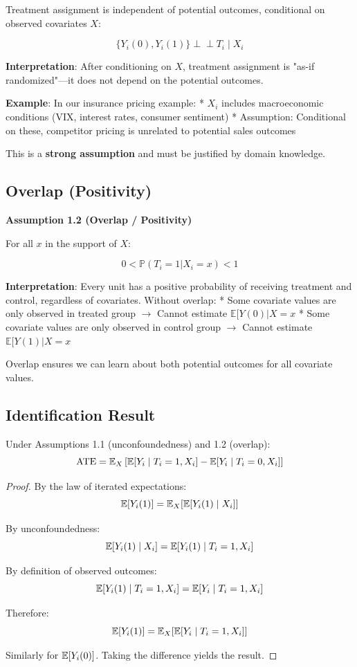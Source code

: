 Treatment assignment is independent of potential outcomes, conditional
on observed covariates \(X\):

\[\{Y_i(0), Y_i(1)\} \perp\!\!\!\perp T_i \mid X_i\]

\textbf{Interpretation}: After conditioning on \(X\), treatment
assignment is "as-if randomized"---it does not depend on the potential
outcomes.

\textbf{Example}: In our insurance pricing example: * \(X_i\) includes
macroeconomic conditions (VIX, interest rates, consumer sentiment) *
Assumption: Conditional on these, competitor pricing is unrelated to
potential sales outcomes

This is a \textbf{strong assumption} and must be justified by domain
knowledge.

\subsection{Overlap (Positivity)}\label{_overlap_positivity}

%
\textbf{Assumption 1.2 (Overlap / Positivity)}

For all \(x\) in the support of \(X\):

\[0 < \mathbb{P}(T_i = 1 | X_i = x) < 1\]

\textbf{Interpretation}: Every unit has a positive probability of
receiving treatment and control, regardless of covariates. Without
overlap: * Some covariate values are only observed in treated group $\to$
Cannot estimate \(\mathbb{E}[Y(0) | X = x\) * Some covariate values
are only observed in control group $\to$ Cannot estimate
\(\mathbb{E}[Y(1) | X = x\)

Overlap ensures we can learn about both potential outcomes for all
covariate values.

\subsection{Identification Result}\label{_identification_result}

\begin{theorem}
\label{thm:ate_identification}
Under Assumptions 1.1 (unconfoundedness) and 1.2 (overlap):
\[
\text{ATE} = \mathbb{E}_X \left[ \mathbb{E}[Y_i \mid T_i = 1, X_i] - \mathbb{E}[Y_i \mid T_i = 0, X_i] \right]
\]
\end{theorem}

\begin{proof}
By the law of iterated expectations:
\[
\mathbb{E}[Y_i(1)] = \mathbb{E}_X[\mathbb{E}[Y_i(1) \mid X_i]]
\]

By unconfoundedness:
\[
\mathbb{E}[Y_i(1) \mid X_i] = \mathbb{E}[Y_i(1) \mid T_i = 1, X_i]
\]

By definition of observed outcomes:
\[
\mathbb{E}[Y_i(1) \mid T_i = 1, X_i] = \mathbb{E}[Y_i \mid T_i = 1, X_i]
\]

Therefore:
\[
\mathbb{E}[Y_i(1)] = \mathbb{E}_X[\mathbb{E}[Y_i \mid T_i = 1, X_i]]
\]

Similarly for $\mathbb{E}[Y_i(0)]$. Taking the difference yields the result.
\end{proof}

